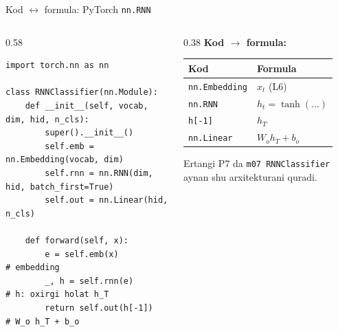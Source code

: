 \documentclass[aspectratio=169,11pt]{beamer}
\begin{document}
\begin{frame}[fragile]{Kod $\leftrightarrow$ formula: PyTorch \texttt{nn.RNN}}
  \begin{columns}[T]
    \begin{column}{0.58\textwidth}
\begin{lstlisting}
import torch.nn as nn

class RNNClassifier(nn.Module):
    def __init__(self, vocab, dim, hid, n_cls):
        super().__init__()
        self.emb = nn.Embedding(vocab, dim)
        self.rnn = nn.RNN(dim, hid, batch_first=True)
        self.out = nn.Linear(hid, n_cls)

    def forward(self, x):
        e = self.emb(x)            # embedding
        _, h = self.rnn(e)         # h: oxirgi holat h_T
        return self.out(h[-1])     # W_o h_T + b_o
\end{lstlisting}
    \end{column}
    \begin{column}{0.38\textwidth}
      \textbf{Kod $\to$ formula:}\\[3pt]
      \footnotesize
      \begin{tabular}{p{1.7cm}p{1.9cm}}
        \toprule
        Kod & Formula \\
        \midrule
        \texttt{nn.Embedding} & $x_t$ (L6) \\
        \texttt{nn.RNN} & $h_t=\tanh(\ldots)$ \\
        \texttt{h[-1]} & $h_T$ \\
        \texttt{nn.Linear} & $W_o h_T+b_o$ \\
        \bottomrule
      \end{tabular}
      \vspace{4pt}
      \begin{tcolorbox}[okbox,top=2pt,bottom=2pt]
        \footnotesize
        Ertangi P7 da \texttt{m07 RNNClassifier} aynan shu arxitekturani quradi.
      \end{tcolorbox}
    \end{column}
  \end{columns}
\end{frame}
\end{document}
